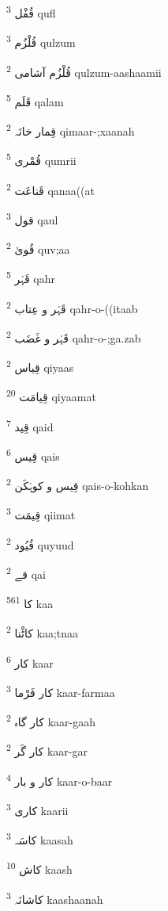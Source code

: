 \documentclass[12pt]{article}
\begin{document}
\begin{RTL}
\begin{multicols}{5}
{\ur قُفْل}   \textsuperscript{3} qufl

{\ur قُلْزُم}   \textsuperscript{3} qulzum

{\ur قُلْزُم آشامی}   \textsuperscript{2} qulzum-aashaamii

{\ur قَلَم}   \textsuperscript{5} qalam

{\ur قِمار خانَہ}   \textsuperscript{2} qimaar-;xaanah

{\ur قُمْری}   \textsuperscript{5} qumrii

{\ur قَناعَت}   \textsuperscript{2} qanaa((at

{\ur قول}   \textsuperscript{3} qaul

{\ur قُویٰ}   \textsuperscript{2} quv;aa

{\ur قَہْر}   \textsuperscript{5} qahr

{\ur قَہْر و عِتاب}   \textsuperscript{2} qahr-o-((itaab

{\ur قَہْر و غَضَب}   \textsuperscript{2} qahr-o-;ga.zab

{\ur قِیاس}   \textsuperscript{2} qiyaas

{\ur قِیامَت}   \textsuperscript{20} qiyaamat

{\ur قِید}   \textsuperscript{7} qaid

{\ur قِیس}   \textsuperscript{6} qais

{\ur قِیس و کوہْکَن}   \textsuperscript{2} qais-o-kohkan

{\ur قِیمَت}   \textsuperscript{3} qiimat

{\ur قُیُود}   \textsuperscript{2} quyuud

{\ur قے}   \textsuperscript{2} qai

{\ur کا}   \textsuperscript{561} kaa

{\ur کاٹْنا}   \textsuperscript{2} kaa;tnaa

{\ur کار}   \textsuperscript{6} kaar

{\ur کار فَرْما}   \textsuperscript{3} kaar-farmaa

{\ur کار گاہ}   \textsuperscript{2} kaar-gaah

{\ur کار گَر}   \textsuperscript{2} kaar-gar

{\ur کار و بار}   \textsuperscript{4} kaar-o-baar

{\ur کاری}   \textsuperscript{3} kaarii

{\ur کاسَہ}   \textsuperscript{3} kaasah

{\ur کاش}   \textsuperscript{10} kaash

{\ur کاشانَہ}   \textsuperscript{3} kaashaanah


\end{multicols}
\end{RTL}
\end{document}
